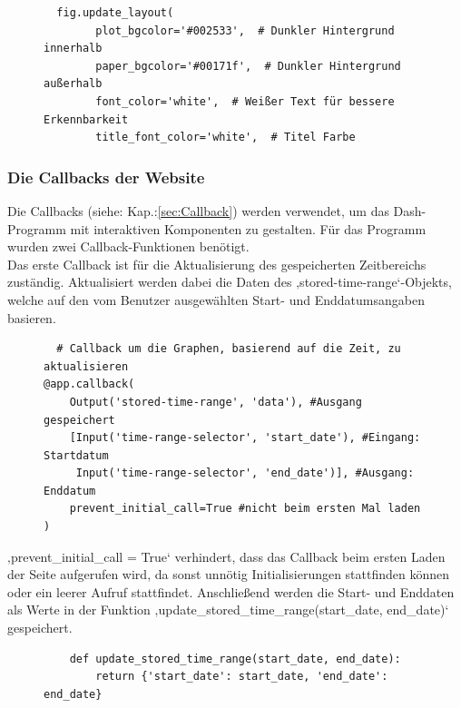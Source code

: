 \vspace{3mm}
\begin{figure}[H]
    \centering
    \begin{verbatim}
  fig.update_layout(
        plot_bgcolor='#002533',  # Dunkler Hintergrund innerhalb
        paper_bgcolor='#00171f',  # Dunkler Hintergrund außerhalb
        font_color='white',  # Weißer Text für bessere Erkennbarkeit
        title_font_color='white',  # Titel Farbe

    \end{verbatim}
\end{figure}

\subsubsection{Die Callbacks der Website}
Die Callbacks (siehe: Kap.:\ref{sec:Callback}) werden verwendet, um das Dash-Programm mit interaktiven Komponenten zu gestalten. Für das Programm wurden zwei Callback-Funktionen benötigt.\\
\vspace{3mm}
Das erste Callback ist für die Aktualisierung des gespeicherten Zeitbereichs zuständig. Aktualisiert werden dabei die Daten des ‚stored-time-range‘-Objekts, welche auf den vom Benutzer ausgewählten Start- und Enddatumsangaben basieren. 
\vspace{3mm}
\begin{figure}[H]
    \centering
    \begin{verbatim}
  # Callback um die Graphen, basierend auf die Zeit, zu aktualisieren 
@app.callback(
    Output('stored-time-range', 'data'), #Ausgang gespeichert
    [Input('time-range-selector', 'start_date'), #Eingang: Startdatum
     Input('time-range-selector', 'end_date')], #Ausgang: Enddatum
    prevent_initial_call=True #nicht beim ersten Mal laden
)
    \end{verbatim}
\end{figure}
‚prevent\_initial\_call = True‘ verhindert, dass das Callback beim ersten Laden der Seite aufgerufen wird, da sonst unnötig Initialisierungen stattfinden können oder ein leerer Aufruf stattfindet. 
Anschließend werden die Start- und Enddaten als Werte in der Funktion ‚update\_stored\_time\_range(start\_date, end\_date)‘ gespeichert. \\
\vspace{3mm}
\begin{figure}[H]
    \centering
    \begin{verbatim}
    def update_stored_time_range(start_date, end_date):
        return {'start_date': start_date, 'end_date': end_date}

    \end{verbatim}
\end{figure}
